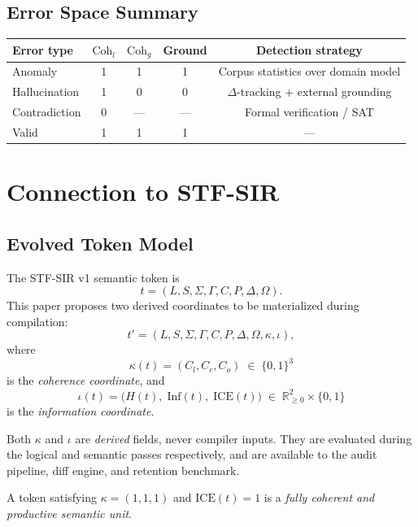 \documentclass{article}
\newcommand{\STF}{{\normalfont\textsc{STF}}}
\newcommand{\SIR}{{\normalfont\textsc{SIR}}}
\newcommand{\ICE}{\mathrm{ICE}}
\newcommand{\Inf}{\mathrm{Inf}}
\begin{document}
\subsection{Error Space Summary}

\begin{center}
\renewcommand{\arraystretch}{1.25}
\begin{tabular}{lcccc}
\toprule
Error type & $\mathrm{Coh}_l$ & $\mathrm{Coh}_g$ & Ground
           & Detection strategy \\
\midrule
Anomaly      & 1 & 1 & 1 & Corpus statistics over domain model \\
Hallucination & 1 & 0 & 0 & $\Delta$-tracking + external grounding \\
Contradiction & 0 & --- & --- & Formal verification / SAT \\
Valid        & 1 & 1 & 1 & --- \\
\bottomrule
\end{tabular}
\end{center}

\section{Connection to STF-SIR}
\label{sec:stfsir}

\subsection{Evolved Token Model}

The \STF{}-\SIR{} v1 semantic token is
\[
  t = (L, S, \Sigma, \Gamma, C, P, \Delta, \Omega).
\]
This paper proposes two derived coordinates to be materialized during compilation:
\[
  t' = (L, S, \Sigma, \Gamma, C, P, \Delta, \Omega, \kappa, \iota),
\]
where
\[
  \kappa(t) = (C_l, C_c, C_o) \;\in\; \{0,1\}^3
\]
is the \emph{coherence coordinate}, and
\[
  \iota(t) = \bigl(H(t),\; \Inf(t),\; \ICE(t)\bigr)
  \;\in\; \mathbb{R}_{\geq 0}^2 \times \{0,1\}
\]
is the \emph{information coordinate}.

Both $\kappa$ and $\iota$ are \emph{derived} fields, never compiler inputs.
They are evaluated during the logical and semantic passes respectively, and
are available to the audit pipeline, diff engine, and retention benchmark.

A token satisfying $\kappa = (1,1,1)$ and $\ICE(t) = 1$ is a \emph{fully
coherent and productive semantic unit}.
\end{document}
